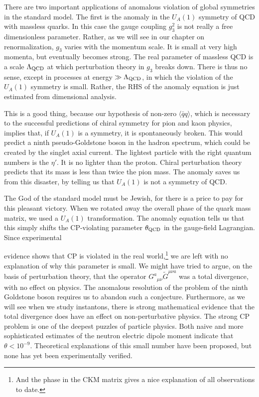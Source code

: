 There are two important applications of anomalous violation of global
symmetries in the standard model. The first is the anomaly in the $U_A(1)$
symmetry of QCD with massless quarks. In this case the gauge coupling $g_3^2$
is not really a free dimensionless parameter. Rather, as we will see in our
chapter on renormalization, $g_3$ varies with the momentum scale. It is small
at very high momenta, but eventually becomes strong. The real parameter of
massless QCD is a scale $\Lambda_{\rm QCD}$ at which perturbation theory in
$g_3$ breaks down. There is thus no sense, except in processes at energy
$\gg\Lambda_{\rm QCD}$, in which the violation of the $U_A(1)$ symmetry is
small. Rather, the RHS of the anomaly equation is just estimated from
dimensional analysis.

This is a good thing, because our hypothesis of non-zero $\langle\bar q q\rangle$,
which is necessary to the successful predictions of chiral symmetry for pion
and kaon physics, implies that, if $U_A(1)$ is a symmetry, it is spontaneously
broken. This would predict a ninth pseudo-Goldstone boson in the hadron
spectrum, which could be created by the singlet axial current. The lightest
particle with the right quantum numbers is the $\eta'$. It is no lighter than
the proton. Chiral perturbation theory predicts that its mass is less than
twice the pion mass. The anomaly saves us from this disaster, by telling us
that $U_A(1)$ is not a symmetry of QCD.

The God of the standard model must be Jewish, for there is a price to pay for
this pleasant victory. When we rotated away the overall phase of the quark
mass matrix, we used a $U_A(1)$ transformation. The anomaly equation tells us
that this simply shifts the CP-violating parameter $\theta_{\rm QCD}$ in the
gauge-field Lagrangian. Since experimental

evidence shows that CP is violated in the real world,\footnote[18]{And the
phase in the CKM matrix gives a nice explanation of all observations to date.}
we are left with no explanation of why this parameter is small. We might have
tried to argue, on the basis of perturbation theory, that the operator
$G^a{}_{\mu\nu}\widetilde G^{\mu\nu a}$ was a total divergence, with no effect
on physics. The anomalous resolution of the problem of the ninth Goldstone
boson requires us to abandon such a conjecture. Furthermore, as we will see
when we study instantons, there is strong mathematical evidence that the total
divergence does have an effect on non-perturbative physics. The strong CP
problem is one of the deepest puzzles of particle physics. Both naive and more
sophisticated estimates of the neutron electric dipole moment indicate that
$\theta<10^{-9}$. Theoretical explanations of this small number have been
proposed, but none has yet been experimentally verified.

